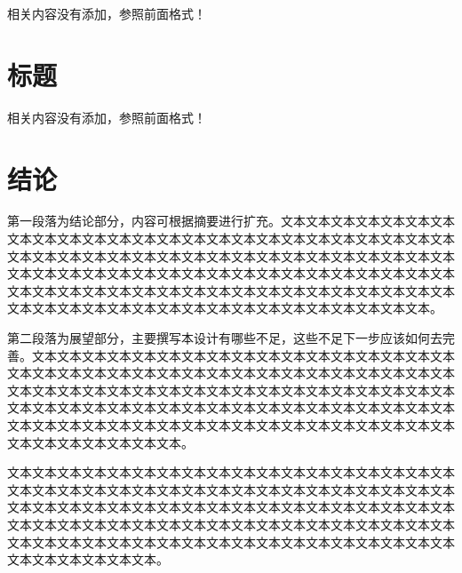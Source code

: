 \documentclass{suse-cs-thesis}
\begin{document}
相关内容没有添加，参照前面格式！

\chapter{标题}

相关内容没有添加，参照前面格式！

\chapter{结论}

第一段落为结论部分，内容可根据摘要进行扩充。文本文本文本文本文本文本文本文本文本文本文本文本文本文本文本文本文本文本文本文本文本文本文本文本文本文本文本文本文本文本文本文本文本文本文本文本文本文本文本文本文本文本文本文本文本文本文本文本文本文本文本文本文本文本文本文本文本文本文本文本文本文本文本文本文本文本文本文本文本文本文本文本文本文本文本文本文本文本文本文本文本文本文本文本文本文本文本文本文本文本文本文本文本文本文本文本。

第二段落为展望部分，主要撰写本设计有哪些不足，这些不足下一步应该如何去完善。文本文本文本文本文本文本文本文本文本文本文本文本文本文本文本文本文本文本文本文本文本文本文本文本文本文本文本文本文本文本文本文本文本文本文本文本文本文本文本文本文本文本文本文本文本文本文本文本文本文本文本文本文本文本文本文本文本文本文本文本文本文本文本文本文本文本文本文本文本文本文本文本文本文本文本文本文本文本文本文本文本文本文本文本文本文本文本文本文本文本文本文本文本文本文本文本。

\begin{acknowledgements}

文本文本文本文本文本文本文本文本文本文本文本文本文本文本文本文本文本文本文本文本文本文本文本文本文本文本文本文本文本文本文本文本文本文本文本文本文本文本文本文本文本文本文本文本文本文本文本文本文本文本文本文本文本文本文本文本文本文本文本文本文本文本文本文本文本文本文本文本文本文本文本文本文本文本文本文本文本文本文本文本文本文本文本文本文本文本文本文本文本文本文本文本文本文本文本文本。

\end{acknowledgements}
\end{document}
